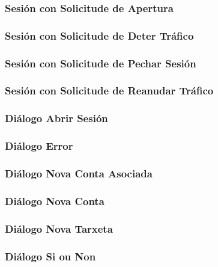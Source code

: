 \documentclass[a4paper,titlepage]{article}
\begin{document}
\subsubsection{Sesión con Solicitude de Apertura}

\subsubsection{Sesión con Solicitude de Deter Tráfico}

\subsubsection{Sesión con Solicitude de Pechar Sesión}

\subsubsection{Sesión con Solicitude de Reanudar Tráfico}

\subsubsection{Diálogo Abrir Sesión}

\subsubsection{Diálogo Error}

\subsubsection{Diálogo Nova Conta Asociada}

\subsubsection{Diálogo Nova Conta}

\subsubsection{Diálogo Nova Tarxeta}

\subsubsection{Diálogo Si ou Non}

\end{document}
